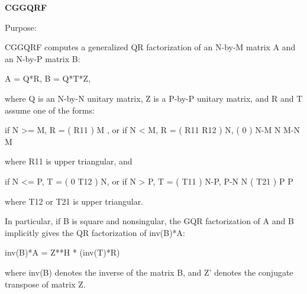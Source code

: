 {\bfseries C\+G\+G\+Q\+R\+F} 

 \begin{DoxyParagraph}{Purpose\+: }
\begin{DoxyVerb} CGGQRF computes a generalized QR factorization of an N-by-M matrix A
 and an N-by-P matrix B:

             A = Q*R,        B = Q*T*Z,

 where Q is an N-by-N unitary matrix, Z is a P-by-P unitary matrix,
 and R and T assume one of the forms:

 if N >= M,  R = ( R11 ) M  ,   or if N < M,  R = ( R11  R12 ) N,
                 (  0  ) N-M                         N   M-N
                    M

 where R11 is upper triangular, and

 if N <= P,  T = ( 0  T12 ) N,   or if N > P,  T = ( T11 ) N-P,
                  P-N  N                           ( T21 ) P
                                                      P

 where T12 or T21 is upper triangular.

 In particular, if B is square and nonsingular, the GQR factorization
 of A and B implicitly gives the QR factorization of inv(B)*A:

              inv(B)*A = Z**H * (inv(T)*R)

 where inv(B) denotes the inverse of the matrix B, and Z' denotes the
 conjugate transpose of matrix Z.\end{DoxyVerb}
 
\end{DoxyParagraph}

